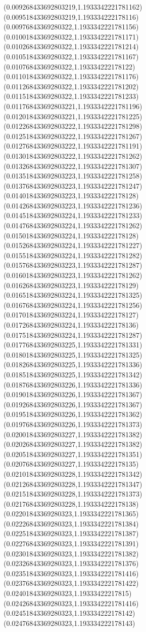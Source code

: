 {(0.009268433692803219,1.1933342221781162)
(0.009518433692803219,1.193334222178116)
(0.00976843369280322,1.1933342221781156)
(0.01001843369280322,1.1933342221781171)
(0.01026843369280322,1.1933342221781214)
(0.01051843369280322,1.1933342221781167)
(0.01076843369280322,1.193334222178122)
(0.01101843369280322,1.1933342221781176)
(0.01126843369280322,1.1933342221781202)
(0.01151843369280322,1.1933342221781233)
(0.011768433692803221,1.1933342221781196)
(0.012018433692803221,1.1933342221781225)
(0.012268433692803222,1.1933342221781298)
(0.012518433692803222,1.1933342221781267)
(0.012768433692803222,1.1933342221781191)
(0.013018433692803222,1.1933342221781262)
(0.013268433692803222,1.1933342221781307)
(0.013518433692803223,1.1933342221781258)
(0.013768433692803223,1.1933342221781247)
(0.014018433692803223,1.193334222178128)
(0.014268433692803223,1.1933342221781236)
(0.014518433692803224,1.1933342221781233)
(0.014768433692803224,1.1933342221781262)
(0.015018433692803224,1.193334222178128)
(0.015268433692803224,1.1933342221781227)
(0.015518433692803224,1.1933342221781282)
(0.015768433692803223,1.1933342221781287)
(0.016018433692803223,1.1933342221781262)
(0.016268433692803223,1.193334222178129)
(0.016518433692803224,1.1933342221781325)
(0.016768433692803224,1.1933342221781256)
(0.017018433692803224,1.193334222178127)
(0.017268433692803224,1.193334222178136)
(0.017518433692803224,1.1933342221781287)
(0.017768433692803225,1.1933342221781331)
(0.018018433692803225,1.1933342221781325)
(0.018268433692803225,1.1933342221781336)
(0.018518433692803225,1.1933342221781342)
(0.018768433692803226,1.1933342221781336)
(0.019018433692803226,1.1933342221781367)
(0.019268433692803226,1.1933342221781367)
(0.019518433692803226,1.1933342221781362)
(0.019768433692803226,1.1933342221781373)
(0.020018433692803227,1.1933342221781382)
(0.020268433692803227,1.1933342221781382)
(0.020518433692803227,1.1933342221781351)
(0.020768433692803227,1.193334222178135)
(0.021018433692803228,1.1933342221781342)
(0.021268433692803228,1.1933342221781347)
(0.021518433692803228,1.1933342221781373)
(0.021768433692803228,1.193334222178138)
(0.02201843369280323,1.1933342221781365)
(0.02226843369280323,1.1933342221781384)
(0.02251843369280323,1.1933342221781387)
(0.02276843369280323,1.1933342221781391)
(0.02301843369280323,1.1933342221781382)
(0.02326843369280323,1.1933342221781376)
(0.02351843369280323,1.1933342221781416)
(0.02376843369280323,1.1933342221781422)
(0.02401843369280323,1.19333422217815)
(0.02426843369280323,1.1933342221781416)
(0.02451843369280323,1.193334222178142)
(0.02476843369280323,1.193334222178143)
}
